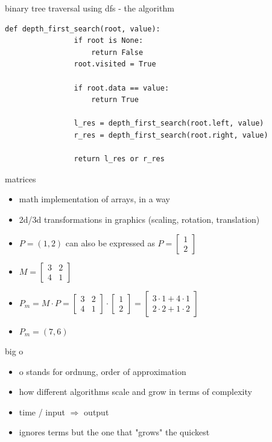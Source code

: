 \documentclass{beamer}
\begin{document}
	\begin{frame}[fragile]{binary tree traversal using dfs - the algorithm}
		\begin{lstlisting}[style=pythonstyle]
			def depth_first_search(root, value):
				if root is None:
					return False
				root.visited = True
			
				if root.data == value:
					return True
			
				l_res = depth_first_search(root.left, value)
				r_res = depth_first_search(root.right, value)
			
				return l_res or r_res
		\end{lstlisting}
	\end{frame}
	
	\begin{frame}{matrices}
		\begin{itemize}
			\item[] math implementation of arrays, in a way
			\item[] 2d/3d transformations in graphics (scaling, rotation, translation) 
			\item[] $P=(1,2)$ can also be expressed as $P=\begin{bmatrix} 1 \\ 2 \end{bmatrix}$
			\item[] $M = \begin{bmatrix} 3 & 2 \\ 4 & 1 \end{bmatrix}$
			\item[] $P_m=M\cdot P = \begin{bmatrix} 3 & 2 \\ 4 & 1 \end{bmatrix}\cdot \begin{bmatrix} 1 \\ 2 \end{bmatrix} = \begin{bmatrix} 3 \cdot 1 + 4 \cdot 1 \\ 2 \cdot 2 + 1 \cdot 2 \end{bmatrix}$
		    \item[] $P_m=(7,6)$
		\end{itemize}
	\end{frame}
	
	\begin{frame}{big o}
		\begin{itemize}
			\item[] o stands for ordnung, order of approximation
			\item[] how different algorithms scale and grow in terms of complexity
			\item[] time / input $\Rightarrow$ output
			\item[] ignores terms but the one that "grows" the quickest
		\end{itemize}
	\end{frame}
	
\end{document}
